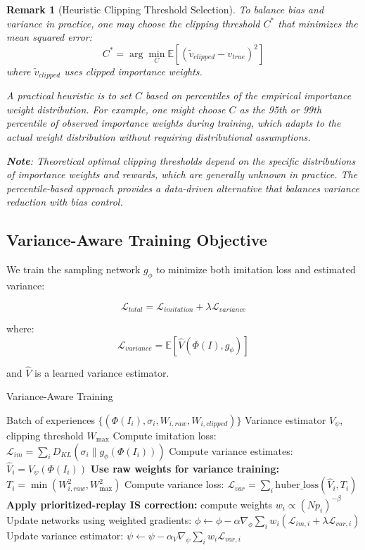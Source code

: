\documentclass[12pt,a4paper]{article}
\newtheorem{remark}[theorem]{Remark}
\begin{document}
\begin{remark}[Heuristic Clipping Threshold Selection]
\label{rem:clipping_threshold}
To balance bias and variance in practice, one may choose the clipping threshold $C^*$ that minimizes the mean squared error:
$$C^* = \arg\min_C \mathbb{E}[(\tilde{v}_{clipped} - v_{true})^2]$$
where $\tilde{v}_{clipped}$ uses clipped importance weights. 

A practical heuristic is to set $C$ based on percentiles of the empirical importance weight distribution. For example, one might choose $C$ as the 95th or 99th percentile of observed importance weights during training, which adapts to the actual weight distribution without requiring distributional assumptions.

\textbf{Note}: Theoretical optimal clipping thresholds depend on the specific distributions of importance weights and rewards, which are generally unknown in practice. The percentile-based approach provides a data-driven alternative that balances variance reduction with bias control.
\end{remark}

\subsection{Variance-Aware Training Objective}

We train the sampling network $g_\phi$ to minimize both imitation loss and estimated variance:

$$\mathcal{L}_{total} = \mathcal{L}_{imitation} + \lambda \mathcal{L}_{variance}$$

where:
$$\mathcal{L}_{variance} = \mathbb{E}[\hat{V}(\Phi(I), g_\phi)]$$

and $\hat{V}$ is a learned variance estimator.

\begin{algorithm}[H]
\caption{Variance-Aware Training}
\begin{algorithmic}
\REQUIRE Batch of experiences $\{(\Phi(I_i), \sigma_i, W_{i,raw}, W_{i,clipped})\}$
\REQUIRE Variance estimator $V_\psi$, clipping threshold $W_{\max}$
\STATE Compute imitation loss: $\mathcal{L}_{im} = \sum_i D_{KL}(\sigma_i \| g_\phi(\Phi(I_i)))$
\STATE Compute variance estimates: $\hat{V}_i = V_\psi(\Phi(I_i))$
\STATE \textbf{Use raw weights for variance training:} $T_i = \min(W_{i,raw}^2, W_{\max}^2)$
\STATE Compute variance loss: $\mathcal{L}_{var} = \sum_i \text{huber\_loss}(\hat{V}_i, T_i)$
\STATE \textbf{Apply prioritized-replay IS correction:} compute weights $w_i \propto (N p_i)^{-\beta}$
\STATE Update networks using weighted gradients: $\phi \leftarrow \phi - \alpha \nabla_\phi \sum_i w_i(\mathcal{L}_{im,i} + \lambda \mathcal{L}_{var,i})$
\STATE Update variance estimator: $\psi \leftarrow \psi - \alpha_V \nabla_\psi \sum_i w_i \mathcal{L}_{var,i}$
\end{algorithmic}
\end{algorithm}
\end{document}
